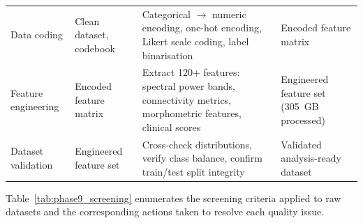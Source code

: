 \begin{xltabular}{\textwidth}{@{} l X X X @{}}
Data coding              & Clean dataset, codebook                                                       & Categorical $\rightarrow$ numeric encoding, one-hot encoding, Likert scale coding, label binarisation & Encoded feature matrix \\
\addlinespace
Feature engineering      & Encoded feature matrix                                                        & Extract 120+ features: spectral power bands, connectivity metrics, morphometric features, clinical scores & Engineered feature set (305~GB processed) \\
\addlinespace
Dataset validation       & Engineered feature set                                                        & Cross-check distributions, verify class balance, confirm train/test split integrity               & Validated analysis-ready dataset \\
\end{xltabular}
\endgroup

\vspace{1.5em}

Table~\ref{tab:phase9_screening} enumerates the screening criteria applied to raw datasets and the corresponding actions taken to resolve each quality issue.

